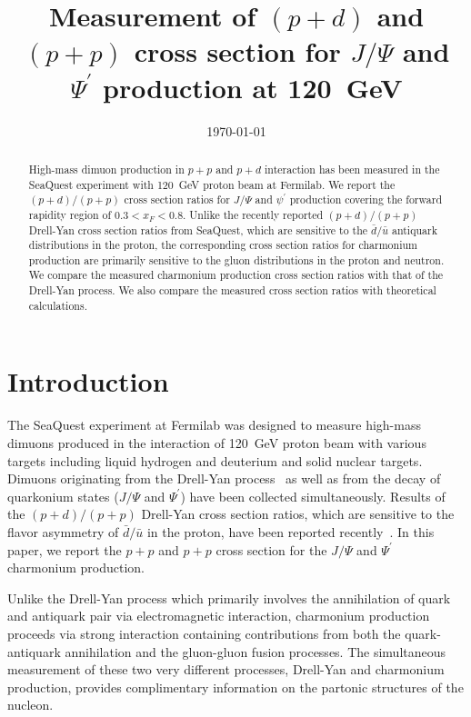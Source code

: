 \documentclass[reprint,aps,unsortedaddress,superscriptaddress,prd,floatfix,showpacs,linenumbers]{revtex4-2}
\begin{document}
\title{Measurement of $(p+d)$ and $(p+p)$ cross section for
	$J/\Psi$ and $\Psi^\prime$ production at \SI{120}{\GeV}}


\date{\today}
\begin{abstract}
	High-mass dimuon production in $p+p$ and $p+d$ interaction has been measured
	in the SeaQuest experiment with \SI{120}{\GeV} proton beam at Fermilab.
	We report the $(p+d) / (p+p)$ cross section
	ratios for $J/\Psi$ and $\psi^\prime$ production covering the forward
	rapidity region of $0.3 < x_F <0.8$. Unlike the recently reported
	$(p+d) / (p+p)$ Drell-Yan cross section ratios from SeaQuest, which are
	sensitive to the
	$\bar{d} / \bar{u}$ antiquark distributions in the proton, the corresponding
	cross section ratios for charmonium production are primarily
	sensitive to the gluon
	distributions in the proton and neutron. We compare the measured
	charmonium production cross section ratios with that of the
	Drell-Yan process. We also compare the measured cross section ratios with
	theoretical calculations.

\end{abstract}


\maketitle
\section{Introduction}
The SeaQuest experiment at Fermilab was designed to measure high-mass dimuons
produced in the interaction of \SI{120}{\GeV} proton beam with various targets
including liquid hydrogen and deuterium and solid nuclear targets. Dimuons
originating from the Drell-Yan process~\cite{drell1970} as well as from the decay of quarkonium
states ($J/\Psi$ and $\Psi^\prime$) have been collected simultaneously. 
Results of the $(p+d) / (p+p)$ Drell-Yan cross section ratios, which are sensitive
to the flavor asymmetry of $\bar{d}/ \bar{u}$ in the proton, have been reported
recently~\cite{dove2021,dove2023}. In this paper, we report the 
$p+p$ and $p+p$ cross section for the $J/\Psi$ and $\Psi^\prime$ charmonium production.

Unlike the Drell-Yan process which primarily involves the annihilation 
of quark and antiquark pair via electromagnetic interaction, charmonium
production proceeds via strong interaction containing contributions from
both the quark-antiquark annihilation and the gluon-gluon
fusion processes. The simultaneous measurement of these two very different
processes, Drell-Yan and charmonium production, provides complimentary
information on the partonic structures of the nucleon.
\end{document}
